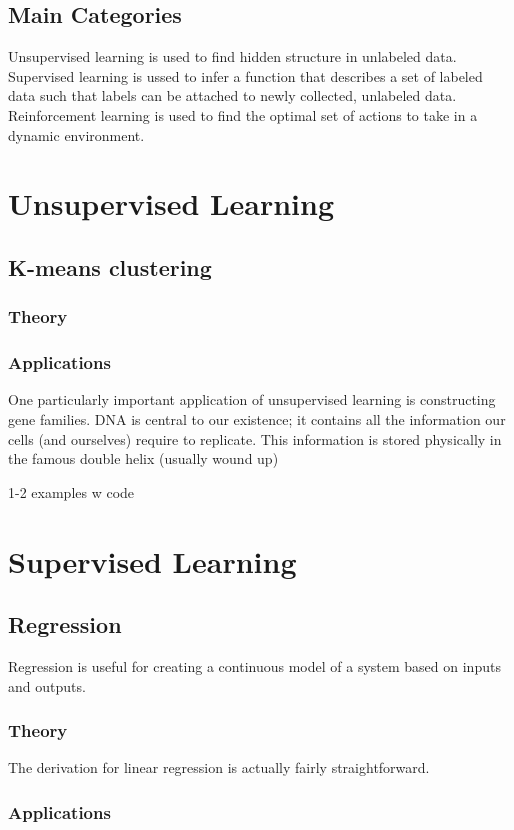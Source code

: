 \documentclass[11pt]{article}
\begin{document}
\subsection{Main Categories}
Unsupervised learning is used to find hidden structure in unlabeled data.
Supervised learning is ussed to infer a function that describes a set of labeled data such that labels can be attached to newly collected, unlabeled data.
Reinforcement learning is used to find the optimal set of actions to take in a dynamic environment.

\section{Unsupervised Learning}
\subsection{K-means clustering}
\subsubsection{Theory}
\subsubsection{Applications}
One particularly important application of unsupervised learning is constructing gene families. DNA is central to our existence; it contains all the information our cells (and ourselves) require to replicate. This information is stored physically in the famous double helix (usually wound up)

1-2 examples w code

\section{Supervised Learning}
\subsection{Regression}
Regression is useful for creating a continuous model of a system based on inputs and outputs.
\subsubsection{Theory}
The derivation for linear regression is actually fairly straightforward.
\subsubsection{Applications}
\end{document}

